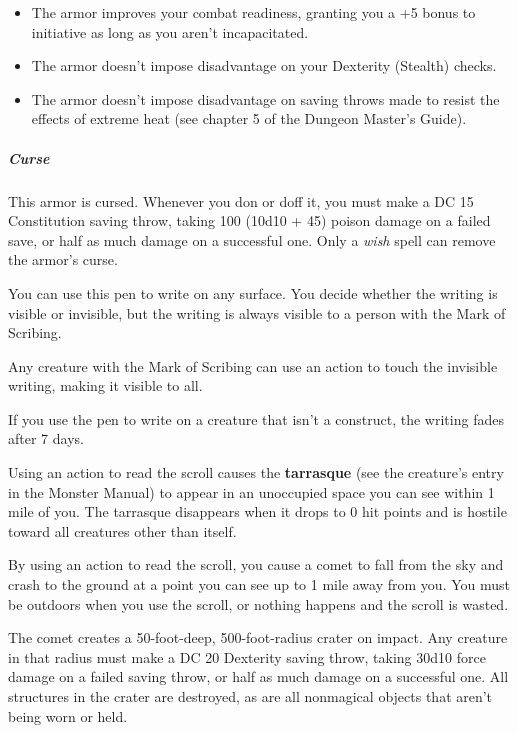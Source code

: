 \documentclass[10pt,a4paper,twoside,bg=print,twocolumn,openany,nodeprecatedcode]{dndbook}
\begin{document}
\begin{itemize}
\item The armor improves your combat readiness, granting you a +5 bonus to initiative as long as you aren't incapacitated.
\item The armor doesn't impose disadvantage on your Dexterity (Stealth) checks.
\item The armor doesn't impose disadvantage on saving throws made to resist the effects of extreme heat (see chapter 5 of the Dungeon Master's Guide).
\end{itemize}

\subparagraph{Curse}
This armor is cursed. Whenever you don or doff it, you must make a DC 15 Constitution saving throw, taking 100 (10d10 + 45) poison damage on a failed save, or half as much damage on a successful one. Only a \textit{wish} spell can remove the armor's curse.

You can use this pen to write on any surface. You decide whether the writing is visible or invisible, but the writing is always visible to a person with the Mark of Scribing.

Any creature with the Mark of Scribing can use an action to touch the invisible writing, making it visible to all.

If you use the pen to write on a creature that isn't a construct, the writing fades after 7 days.

Using an action to read the scroll causes the \textbf{tarrasque} (see the creature's entry in the Monster Manual) to appear in an unoccupied space you can see within 1 mile of you. The tarrasque disappears when it drops to 0 hit points and is hostile toward all creatures other than itself.

By using an action to read the scroll, you cause a comet to fall from the sky and crash to the ground at a point you can see up to 1 mile away from you. You must be outdoors when you use the scroll, or nothing happens and the scroll is wasted.

The comet creates a 50-foot-deep, 500-foot-radius crater on impact. Any creature in that radius must make a DC 20 Dexterity saving throw, taking 30d10 force damage on a failed saving throw, or half as much damage on a successful one. All structures in the crater are destroyed, as are all nonmagical objects that aren't being worn or held.
\end{document}
